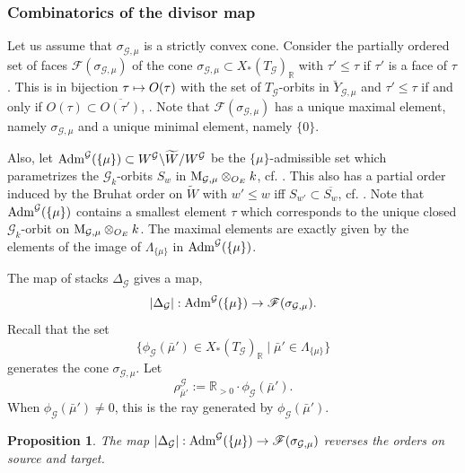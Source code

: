 \documentclass[reqno, 10pt]{amsart}
\makeatletter
\newcommand{\BR}{\ensuremath{\mathbb {R}}\xspace}
\newcommand{\CG}{\ensuremath{\mathcal {G}}\xspace}
\newcommand{\wt}{\widetilde}
\newcommand{\ov}{\overline}
\newcommand{\bs}{\backslash}
\newtheorem{proposition}[subsubsection]{Proposition}
\theoremstyle{definition}
\numberwithin{equation}{subsection}
\numberwithin{subsubsection}{subsection}
\renewcommand{\to}{%
   \ifbool{@display}{\longrightarrow}{\rightarrow}%
   }
\let\shortmapsto\mapsto
\renewcommand{\mapsto}{%
   \ifbool{@display}{\shortmapsto}{\shortmapsto}%
   }
\newcommand{\br}{\breve}
\newcommand{\Mloc}{{\rm M}}
\makeatother
\begin{document}

\subsubsection{Combinatorics of the divisor map}\label{ss:comfa} 

 Let us assume that $\sigma_{\CG, \mu}$ is a strictly convex cone. 
 Consider the partially ordered set of faces ${\mathscr F}(\sigma_{\CG,\mu})$ of the cone $\sigma_{\CG,\mu}\subset X_*(T_\CG)_\BR$ with $\tau'\leq \tau$
if $\tau'$ is a face of $\tau$. This is in bijection 
$\tau\mapsto O(\tau)$ with the set of
$T_\CG$-orbits in $\br Y_{\CG,\mu}$ and $\tau'\leq \tau$ if and only if $O(\tau)\subset \ov{O(\tau')}$, \cite[Thm. 3.2.6]{CLS}. Note that  ${\mathscr F}(\sigma_{\CG,\mu})$  has a unique maximal element, namely $\sigma_{\CG,\mu}$  and a unique minimal element, namely $\{0\}$.

Also, let ${\rm Adm}^\CG(\{\mu\})\subset W^\CG\bs \wt W/W^\CG$ be the $\{\mu\}$-admissible set which parametrizes the $\CG_k$-orbits $S_w$
in $\Mloc_{\CG,\mu}\otimes_{O_E}k$, cf. \cite[\S 4.4]{PRS}. This   also has a partial order induced by the Bruhat order on $\wt W$ with $w'\leq w$ iff $S_{w'}\subset \ov{S_w}$, cf. \cite[Prop. 4.18]{PRS}.
Note that ${\rm Adm}^\CG(\{\mu\})$ contains a smallest element $\tau$ which corresponds to the unique closed $\CG_k$-orbit on 
$\Mloc_{\CG,\mu}\otimes_{O_E}k$.  The maximal elements are exactly given by the elements of  the image of $\Lambda_{\{\mu\}}$ in ${\rm Adm}^\CG(\{\mu\})$.

The map of stacks $\Delta_\CG$  gives a map,
\begin{equation}\label{divcomb}
|\Delta_\CG|: {\rm Adm}^\CG(\{\mu\})\to {\mathscr F}(\sigma_{\CG,\mu}).
\end{equation}
Recall that the set 
 $$
 \{\phi_\CG(\bar\mu')\in X_*(T_\CG)_\BR\mid \bar\mu'\in\Lambda_{\{\mu\}}\}
 $$
 generates the cone $\sigma_{\CG,\mu}$. Let 
 \[
 \rho^\CG_{\bar\mu'}:=\BR_{>0}\cdot \phi_\CG(\bar\mu').
 \]
When $\phi_\CG(\bar\mu')\neq 0$, this is the ray generated by $\phi_\CG(\bar\mu')$.
 

 
  
  \begin{proposition}\label{prop:deltastrata}
  The  map $|\Delta_\CG|: {\rm Adm}^\CG(\{\mu\})\to {\mathscr F}(\sigma_{\CG,\mu})$ reverses the  orders on source and target.
     \end{proposition}
   
\end{document}
